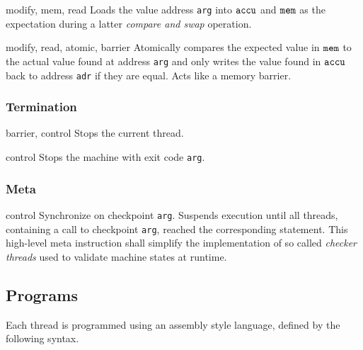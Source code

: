 
{}
{modify, mem, read}
{Loads the value  address \texttt{arg} into $\texttt{accu}$ and $\texttt{mem}$ as the expectation during a latter \emph{compare and swap} operation.}

{}
{modify, read, atomic, barrier}
{Atomically compares the expected value in $\texttt{mem}$ to the actual value found at address \texttt{arg} and only writes the value found in $\texttt{accu}$ back to address \texttt{adr} if they are equal.
Acts like a memory barrier.
}

\subsubsection*{Termination}


{}
{barrier, control}
{Stops the current thread.}

{}
{control}
{Stops the machine with exit code \texttt{arg}.}

\subsubsection*{Meta}

{}
{control}
{Synchronize on checkpoint \texttt{arg}.
Suspends execution until all threads, containing a call to checkpoint \texttt{arg}, reached the corresponding  statement.
This high-level meta instruction shall simplify the implementation of so called \emph{checker threads} used to validate machine states at runtime.}

\newpage

\subsection{Programs}

Each thread is programmed using an assembly style language, defined by the following syntax.

